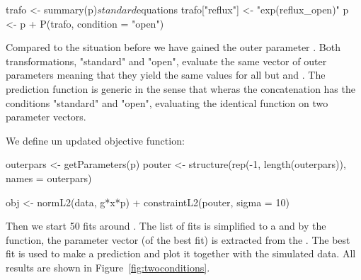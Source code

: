 \documentclass[article]{jss}
\begin{document}
\begin{CodeChunk}
\begin{CodeInput}
trafo <- summary(p)$standard$equations
trafo["reflux"] <- "exp(reflux_open)"
p <- p + P(trafo, condition = "open")
\end{CodeInput}
\end{CodeChunk}

Compared to the situation before we have gained the outer parameter . Both transformations, "standard" and "open", evaluate the same vector of outer parameters meaning that they yield the same values for all but  and . The prediction function  is generic in the sense that  wheras the concatenation  has the conditions "standard" and "open", evaluating the identical function  on two parameter vectors.

We define un updated objective function:
\begin{CodeChunk}
\begin{CodeInput}
outerpars <- getParameters(p)
pouter <- structure(rep(-1, length(outerpars)), names = outerpars)

obj <- normL2(data, g*x*p) + constraintL2(pouter, sigma = 10)
\end{CodeInput}
\end{CodeChunk}

Then we start 50 fits around . The list of fits is simplified to a  and by the  function, the parameter vector (of the best fit) is extracted from the . The best fit is used to make a prediction and plot it together with the simulated data. All results are shown in Figure~\ref{fig:twoconditions}.
\end{document}
